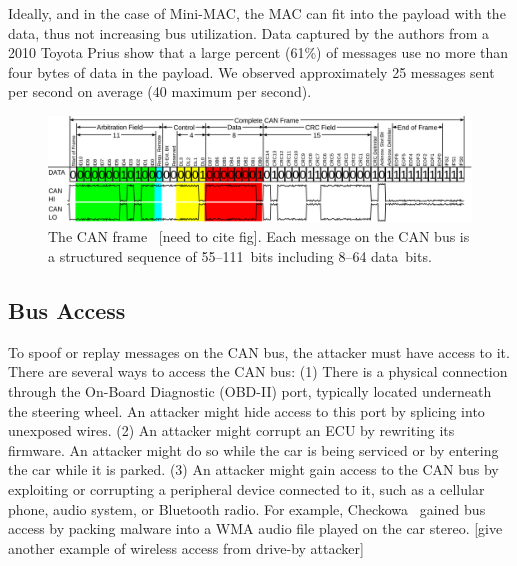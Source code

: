 
Ideally, and in the case of Mini-MAC, the MAC can fit into the payload with the data, thus not increasing bus utilization. Data captured by the authors from a 2010 Toyota Prius show that a large percent (61\%) of messages use no more than four bytes of data in the payload.
We observed approximately 25 messages sent per second on average (40 maximum per second).



	\begin{figure}
		\centering
		\includegraphics[width=\linewidth]{figures/can_frame.png}
		\caption{The CAN frame~\cite{} [need to cite fig].  
		Each message on the CAN bus is a structured sequence of 55--111~bits including 8--64 data~bits.}
		\label{fig-frame}
	\end{figure}

\subsection{Bus Access}

To spoof or replay messages on the CAN bus, the attacker must have access to it.
There are several ways to access the CAN bus:  (1) There is a
physical connection through the On-Board Diagnostic (OBD-II) port, 
typically located underneath the steering wheel.  An attacker might hide
access to this port by splicing into unexposed wires.
(2) An attacker might corrupt an ECU by rewriting its firmware. An attacker might
do so while the car is being serviced or by entering the car while it is parked.
(3) An attacker might gain access to the CAN bus by exploiting or corrupting a peripheral
device connected to it, such as a cellular phone, audio system, or Bluetooth
radio.  For example, Checkowa~\cite{Checkoway-2011} gained bus access by packing 
malware into a WMA audio file played on the car stereo. [give another example
of wireless access from drive-by attacker]

